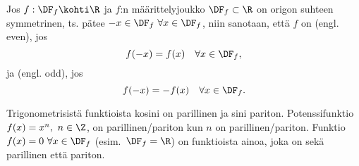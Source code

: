 \begin{Def} \label{parilliset ja parittomat funktiot} Jos $f: \DF_f \kohti \R$ ja $f$:n 
määrittelyjoukko $\DF_f \subset \R$ on origon suhteen symmetrinen, ts. pätee 
$-x \in \DF_f\ \forall x\in\DF_f$, niin sanotaan, että $f$ on  (engl. even), jos
\[
f(-x)=f(x) \quad \forall x\in\DF_f,
\]
ja  (engl. odd), jos
\[
f(-x)=-f(x) \quad \forall x\in\DF_f.
\] \end{Def}
\begin{Exa} Trigonometrisistä funktioista kosini on parillinen ja sini pariton. Potenssifunktio
$f(x) = x^n,\ n \in \Z$, on parillinen/pariton kun $n$ on parillinen/pariton. Funktio 
$f(x)=0\ \forall x\in\DF_f$ (esim.\ $\DF_f=\R$) on funktioista ainoa, joka on sekä parillinen
että pariton. \loppu 
\end{Exa}


